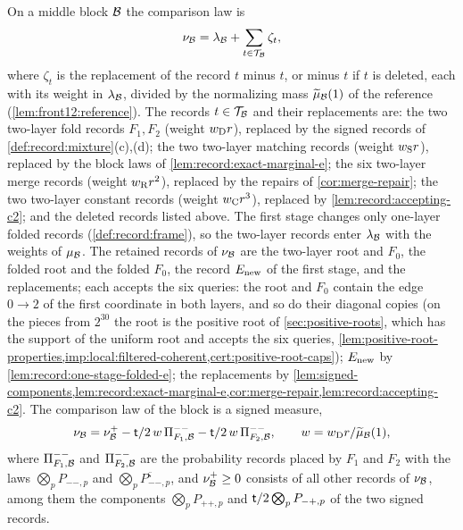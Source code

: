 On a middle block $\mathcal B$ the comparison law is
\[
 \nu_\mathcal B=\lambda_\mathcal B+\sum_{t\in\mathcal T_\mathcal B}\zeta_t,
\]
where $\zeta_t$ is the replacement of the record $t$ minus $t$, or minus $t$ if
$t$ is deleted, each with its weight in $\lambda_\mathcal B$, divided
by the normalizing mass $\widetilde\mu_\mathcal B(1)$ of the reference
(\cref{lem:front12:reference}). The records $t\in\mathcal T_\mathcal B$ and their
replacements are: the two two-layer fold records $F_1,F_2$ (weight
$w_{\rm D}r$), replaced by the signed records of
\cref{def:record:mixture}(c),(d); the two two-layer matching records (weight
$w_{\rm S}r$), replaced by the block laws of \cref{lem:record:exact-marginal-e};
the six two-layer merge records (weight $w_{\rm R}r^2$), replaced by the repairs
of \cref{cor:merge-repair}; the two two-layer constant records (weight
$w_{\rm C}r^3$), replaced by \cref{lem:record:accepting-c2}; and the deleted records listed above. The first
stage changes only one-layer folded records (\cref{def:record:frame}), so the
two-layer records enter $\lambda_\mathcal B$ with the weights of $\mu_\mathcal B$. The
retained records of $\nu_\mathcal B$ are the two-layer root and $F_0$, the folded root
and the folded $F_0$, the record $E_{\rm new}$ of the first stage, and the
replacements; each accepts the six queries: the root and $F_0$ contain the edge
$0\to2$ of the first coordinate in both layers, and so do their diagonal copies
(on the pieces from $2^{30}$ the root is the positive root of
\cref{sec:positive-roots}, which has the support of the uniform root and
accepts the six queries, \cref{lem:positive-root-properties,imp:local:filtered-coherent,cert:positive-root-caps}); $E_{\rm new}$ by
\cref{lem:record:one-stage-folded-e}; the replacements by
\cref{lem:signed-components,lem:record:exact-marginal-e,cor:merge-repair,lem:record:accepting-c2}. The
comparison law of the block is a signed measure,
\[
 \nu_\mathcal B=\nu^+_\mathcal B-\mathsf t/2\,w\,\Pi^{--}_{F_1,\mathcal B}-\mathsf t/2\,w\,\Pi^{--}_{F_2,\mathcal B},
 \qquad w=w_{\rm D}r/\widetilde\mu_\mathcal B(1),
\]
where $\Pi^{--}_{F_1,\mathcal B}$ and $\Pi^{--}_{F_2,\mathcal B}$ are the probability records
placed by $F_1$ and $F_2$ with the laws $\bigotimes_pP_{--,p}$ and
$\bigotimes_pP^\varsigma_{--,p}$, and $\nu^+_\mathcal B\ge0$ consists of all other records
of $\nu_\mathcal B$, among them the components $\bigotimes_pP_{++,p}$ and
$\mathsf t/2\bigotimes_pP_{-+,p}$ of the two signed records.

